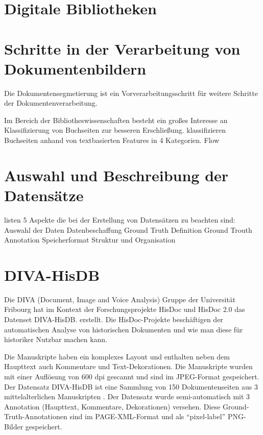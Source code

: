 \section{Digitale Bibliotheken}


\section{Schritte in der Verarbeitung von Dokumentenbildern}
Die Dokumentensegmetierung ist ein Vorverarbeitungsschritt für weitere Schritte der Dokumentenverarbeitung.

Im Bereich der Bibliotheswissenschaften besteht ein großes Interesse an Klassifizierung von
Buchseiten zur besseren Erschließung.
\cite{McConnaugheyLabeledSegmentationPrinted2017} klassifizieren Buchseiten anhand von textbasierten Features in 4 Kategorien. 
Flow

\section{Auswahl und Beschreibung der Datensätze}
\textcite[985\psqq]{DoermannHandbookdocumentimage2014} listen 5 Aspekte die bei der Erstellung von Datensätzen zu beachten sind:
Auswahl der Daten
Datenbeschaffung
Ground Truth Definition
Ground Trouth Annotation
Speicherformat
Struktur und Organisation

\section{DIVA-HisDB}
Die DIVA (Document, Image and Voice Analysis) Gruppe der Universität Fribourg hat im Kontext der Forschungsprojekte HisDoc und HisDoc 2.0 
das Datenset DIVA-HisDB. erstellt.
Die HisDoc-Projekte beschäftigen der automatischen Analyse von historischen Dokumenten und
wie man diese für historiker Nutzbar machen kann.

Die Manuskripte haben ein komplexes Layout und enthalten neben dem Haupttext auch Kommentare und Text-Dekorationen.
Die Manuskripte wurden mit einer Auflösung von 600 dpi gescannt und sind im  JPEG-Format gespeichert. 
Der Datensatz DIVA-HisDB ist eine Sammlung von 150 Dokumentenseiten aus 3 mittelalterlichen Manuskripten \autocite{SimistiraICDAR2017CompetitionLayout2017}.
Der Datensatz wurde semi-automatisch mit 3 Annotation (Haupttext, Kommentare, Dekorationen) versehen.
Diese Ground-Truth-Annotationen sind im PAGE-XML-Format und als ``pixel-label'' PNG-Bilder gespeichert.

